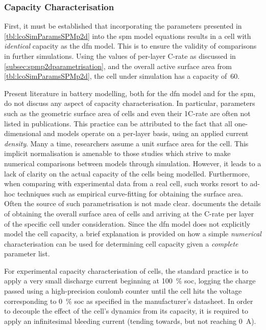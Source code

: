 \subsubsection*{Capacity Characterisation}\label{subsubsec:capcharspmp2d}

First, it  must be  established that incorporating  the parameters  presented in
\cref{tbl:lcoSimParamsSPMp2d} into  the \gls{spm}  model equations results  in a
cell with  \emph{identical} capacity as the  \gls{dfn} model. This is  to ensure
the  validity  of  comparisons  in  further simulations.  Using  the  values  of
per-layer C-rate  as discussed  in \cref{subsec:spmp2dparametrisation},  and the
overall active  surface area from \cref{tbl:lcoSimParamsSPMp2d},  the cell under
simulation has a capacity of~\SI{60}{\amphour}.

Present literature  in battery modelling, both  for the \gls{dfn} model  and for
the  \gls{spm}, do  not  discuss  any aspect  of  capacity characterisation.  In
particular,  parameters  such  as  the  geometric  surface  area  of  cells  and
even  their 1C-rate  are often  not listed  in publications.  This practice  can
be  attributed  to  the  fact  that  all  one-dimensional  and  
models operate  on a per-layer  basis, using an applied  current \emph{density}.
Many  a  time,  researchers assume  a  unit  surface  area  for the  cell.  This
implicit  normalisation  is amenable  to  those  studies  which strive  to  make
numerical comparisons  between models through  simulation. However, it  leads to
a  lack  of  clarity  on  the  actual capacity  of  the  cells  being  modelled.
Furthermore, when comparing with experimental data  from a real cell, such works
resort to  ad-hoc techniques such  as empirical curve-fitting for  obtaining the
surface  area. Often  the  source of  such parametrisation  is  not made  clear.
  documents  the  details of  obtaining  the  overall
surface area  of cells  and arriving  at the  C-rate per  layer of  the specific
cell  under  consideration.  Since  the  \gls{dfn}  model  does  not  explicitly
model  the cell  capacity,  a brief  explanation  is provided  on  how a  simple
\emph{numerical}  characterisation can  be  used for  determining cell  capacity
given a \emph{complete} parameter list.


For experimental capacity characterisation of cells, the standard practice is to
apply a very small discharge  current beginning at \SI{100}{\percent} \gls{soc},
logging the charge passed using a  high-precision coulomb counter until the cell
hits the voltage corresponding to \SI{0}{\percent} \gls{soc} as specified in the
manufacturer's datasheet. In order to decouple the effect of the cell's dynamics
from its  capacity, it is  required to  apply an infinitesimal  bleeding current
(tending towards, but not reaching \SI{0}{\ampere}).

